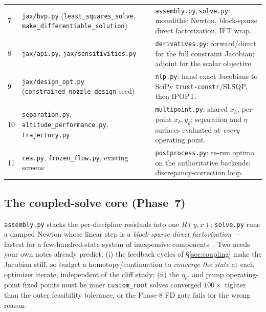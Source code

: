 \documentclass[11pt]{article}
\newcommand{\cmd}[1]{\nolinkurl{#1}}
\newcommand{\cstar}{c^{*}}
\begin{document}
{\begin{longtable}{@{}p{0.55cm}p{6.7cm}p{7.7cm}@{}}
7 & \cmd{jax/bvp.py} (\cmd{least\_squares\_solve}, \cmd{make\_differentiable\_solution}) & \cmd{assembly.py},\,\cmd{solve.py}: monolithic Newton, block-sparse direct factorization, IFT wrap. \\
8 & \cmd{jax/api.py}, \cmd{jax/sensitivities.py} & \cmd{derivatives.py}: forward/direct for the full constraint Jacobian; adjoint for the scalar objective. \\
9 & \cmd{jax/design\_opt.py} (\cmd{constrained\_nozzle\_design} seed) & \cmd{nlp.py}: hand exact Jacobians to SciPy \cmd{trust-constr}/SLSQP, then IPOPT. \\
10 & \cmd{separation.py}, \cmd{altitude\_performance.py}, \cmd{trajectory.py} & \cmd{multipoint.py}: shared $x_h$, per-point $x_k,y_k$; separation and $\eta$ surfaces evaluated at \emph{every} operating point. \\
11 & \cmd{cea.py}, \cmd{frozen\_flow.py}, existing screens & \cmd{postprocess.py}: re-run optima on the authoritative backends; discrepancy-correction loop. \\
\bottomrule
\end{longtable}}

\subsection{The coupled-solve core (Phase~7)}
\cmd{assembly.py} stacks the per-discipline residuals into one $R(y,x)$;
\cmd{solve.py} runs a damped Newton whose linear step is a \emph{block-sparse
direct factorization} --- fastest for a few-hundred-state system of inexpensive
components~\cite{gray2019,benchmark2020}. Two needs your own notes already
predict: (i) the feedback cycles of \S\ref{sec:coupling} make the Jacobian stiff,
so budget a homotopy/continuation to \emph{converge the state} at each optimizer
iterate, independent of the cliff study; (ii) the $\eta_{\cstar}$ and pump
operating-point fixed points must be inner \cmd{custom\_root} solves converged
$100\times$ tighter than the outer feasibility tolerance, or the Phase-8 FD gate
fails for the wrong reason.
\end{document}
